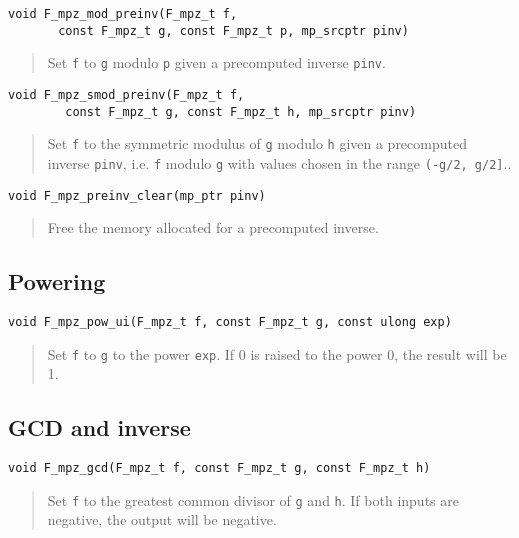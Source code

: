\documentclass[a4paper,10pt]{article}
\newcommand{\code}{\lstinline}
\begin{document}
\begin{lstlisting}
void F_mpz_mod_preinv(F_mpz_t f, 
       const F_mpz_t g, const F_mpz_t p, mp_srcptr pinv)
\end{lstlisting}
\begin{quote}
Set \code{f} to \code{g} modulo \code{p} given a precomputed inverse \code{pinv}.
\end{quote}

\begin{lstlisting}
void F_mpz_smod_preinv(F_mpz_t f, 
        const F_mpz_t g, const F_mpz_t h, mp_srcptr pinv)
\end{lstlisting}
\begin{quote}
Set \code{f} to the symmetric modulus of \code{g} modulo \code{h} given a precomputed inverse \code{pinv}, i.e. \code{f} modulo \code{g} with values chosen in the range \code{(-g/2, g/2]}..
\end{quote}

\begin{lstlisting}
void F_mpz_preinv_clear(mp_ptr pinv)
\end{lstlisting}
\begin{quote}
Free the memory allocated for a precomputed inverse.
\end{quote}

\subsection{Powering}

\begin{lstlisting}
void F_mpz_pow_ui(F_mpz_t f, const F_mpz_t g, const ulong exp)
\end{lstlisting}
\begin{quote}
Set \code{f} to \code{g} to the power \code{exp}. If 0 is raised to the power 0, the result will be 1.
\end{quote}

\subsection{GCD and inverse}

\begin{lstlisting}
void F_mpz_gcd(F_mpz_t f, const F_mpz_t g, const F_mpz_t h)
\end{lstlisting}
\begin{quote}
Set \code{f} to the greatest common divisor of \code{g} and \code{h}. If both inputs are negative, the output will be negative.
\end{quote}
\end{document}
